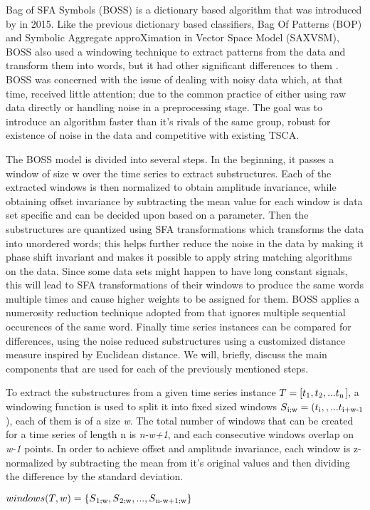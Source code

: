 Bag of SFA Symbols (BOSS) is a dictionary based algorithm that was introduced by \cite{schafer2015boss} in 2015.
Like the previous dictionary based classifiers, Bag Of Patterns (BOP) and Symbolic Aggregate approXimation in Vector Space Model (SAXVSM),
BOSS also used a windowing technique to extract patterns from the data and transform them into words, but it had other significant differences to them \cite{bagnall2017great}.
BOSS was concerned with the issue of dealing with noisy data which, at that time, received little attention; due to the common practice of
either using raw data directly or handling noise in a preprocessing stage. The goal was to introduce an algorithm faster than it's rivals of the same group,
robust for existence of noise in the data and competitive with existing TSCA.

The BOSS model is divided into several steps. In the beginning, it passes a window of size w over the time series to extract substructures.
Each of the extracted windows is then normalized to obtain amplitude invariance, while obtaining offset invariance by subtracting the mean value
for each window is data set specific and can be decided upon based on a parameter.
Then the substructures are quantized using SFA transformations which transforms the data into unordered words;
this helps further reduce the noise in the data by making it phase shift invariant and makes it possible to apply string matching algorithms on the data.
Since some data sets might happen to have long constant signals, this will lead to SFA transformations of their windows to produce the same words multiple times
and cause higher weights to be assigned for them. BOSS applies a numerosity reduction technique adopted from \cite{lin2007experiencing,lin2012rotation}
that ignores multiple sequential occurences of the same word.
Finally time series instances can be compared for differences, using the noise reduced substructures using a customized distance measure inspired by Euclidean distance.
We will, briefly, discuss the main components that are used for each of the previously mentioned steps.

To extract the substructures from a given time series instance $T = [t\textsubscript{1},t\textsubscript{2},...t\textsubscript{n}$],
a windowing function is used to split it into fixed sized windows $S\textsubscript{i;w} = (t\textsubscript{i},,...t\textsubscript{i+w-1}$), each of them is of a size \emph{w}.
The total number of windows that can be created for a time series of length n is \emph{n-w+1}, and each consecutive windows overlap on \emph{w-1} points.
In order to achieve offset and amplitude invariance, each window is z-normalized by subtracting the mean from it's original values and then dividing the difference
by the standard deviation.
\begin{definition}
    $windows(T,w) = \{ S\textsubscript{1;w}, S\textsubscript{2;w}, ...,  S\textsubscript{n-w+1;w} \}$
\end{definition}

